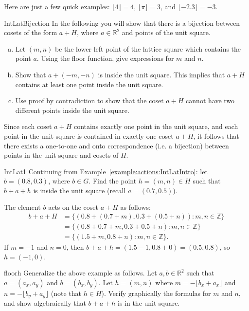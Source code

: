Here are just a few quick examples: $\lfloor 4 \rfloor = 4$, $\lfloor \pi \rfloor = 3$, and $\lfloor -2.3 \rfloor = -3$.

\begin{exercise}{IntLatBijection} In the following you will show that there is a bijection between cosets of the form $a+H$, where $a\in\mathbb{R}^2$ and points of the unit square.
\begin{enumerate}[(a)]
\item Let $(m,n)$ be the lower left point of the lattice square which contains the point $a$. Using the floor function, give  expressions for $m$ and $n$.
\item Show that $a+(-m,-n)$ is inside the unit square. This implies that $a+H$ contains at least one point inside the unit square.
\item Use proof by contradiction to show that the coset $a+H$ cannot have two different points inside the unit square.
\end{enumerate}
Since each coset $a+H$ contains exactly one point in the unit square, and each point in the unit square is contained in exactly one coset $a+H$, it follows that there exists a one-to-one and onto correspondence (i.e. a bijection) between points in the unit square and cosets of $H$.
\end{exercise}

\begin{example}{IntLat1} Continuing from Example~\ref{example:actions:IntLatIntro}: let $b=(0.8,0.3)$, where $b \in G$. Find the point $h=(m,n) \in H$ such that $b+a+h$ is inside the unit square (recall $a=(0.7,0.5)$).

The element $b$ acts on the coset $a+H$ as follows:  
\begin{align*}
 b+a+H &=\{(0.8+(0.7+m), 0.3+(0.5+n)):m, n \in \mathbb{Z}\}\\
&=\{(0.8+0.7+m, 0.3+0.5+n):m, n \in \mathbb{Z}\}\\
&=\{(1.5+m, 0.8+n):m, n \in \mathbb{Z}\}. 
\end{align*}
If $m=-1$ and $n=0$, then $b+a+h=(1.5-1,0.8+0)=(0.5,0.8)$, so $h=(-1,0)$.
\end{example}

\begin{exercise}{floorh} Generalize the above example as follows. Let $a,b \in \mathbb{R}^2$ such that $a=(a_x,a_y)$ and $b=(b_x,b_y)$. Let $h=(m,n)$ where $m=-\lfloor b_x+a_x \rfloor$ and $n=-\lfloor b_y+a_y \rfloor$ (note that $h \in H$). Verify graphically the formulas for $m$ and $n$, and show algebraically that $b+a+h$ is in the unit square.
\end{exercise}


